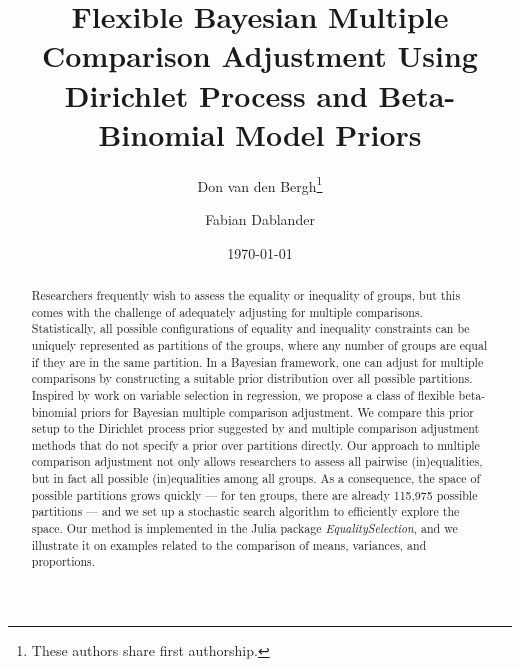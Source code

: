 \documentclass[11pt,a4paper]{article}
\date{}
\title{Flexible Bayesian Multiple Comparison Adjustment Using Dirichlet Process and Beta-Binomial Model Priors}
\author{Don van den Bergh\thanks{These authors share first authorship.} }
\author{Fabian Dablander\samethanks[1]}
\affil{Department of Psychological Methods, University of Amsterdam}
\date{\today}
\theoremstyle{definition} %
\theoremstyle{case}
\begin{document}
\maketitle

\begin{abstract}
\noindent Researchers frequently wish to assess the equality or inequality of groups, but this comes with the challenge of adequately adjusting for multiple comparisons. Statistically, all possible configurations of equality and inequality constraints can be uniquely represented as partitions of the groups, where any number of groups are equal if they are in the same partition. In a Bayesian framework, one can adjust for multiple comparisons by constructing a suitable prior distribution over all possible partitions. Inspired by work on variable selection in regression, we propose a class of flexible beta-binomial priors for Bayesian multiple comparison adjustment. We compare this prior setup to the Dirichlet process prior suggested by \textcite{gopalan1998bayesian} and multiple comparison adjustment methods that do not specify a prior over partitions directly. Our approach to multiple comparison adjustment not only allows researchers to assess all pairwise (in)equalities, but in fact all possible (in)equalities among all groups. As a consequence, the space of possible partitions grows quickly --- for ten groups, there are already 115,975 possible partitions --- and we set up a stochastic search algorithm to efficiently explore the space. Our method is implemented in the Julia package \textit{EqualitySelection}, and we illustrate it on examples related to the comparison of means, variances, and proportions.
\end{abstract}

\iffalse
\end{document}
